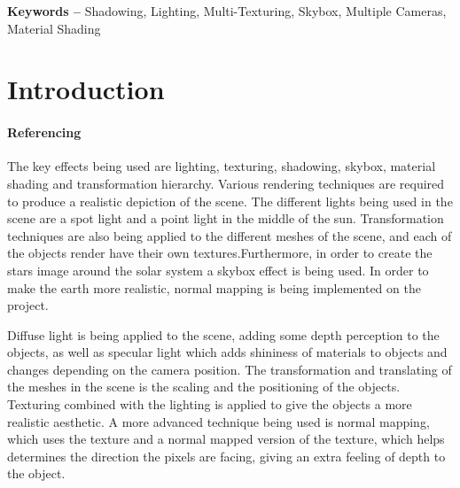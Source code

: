 \documentclass[10pt, a4paper]{article}
\title{\mytitle}
\author{\myauthor\hspace{1em}\\\contact\\Edinburgh Napier University\hspace{0.5em}-\hspace{0.5em}\mymodule}
\date{}
\newcommand{\figuremacro}[5]{
    \begin{figure}[#1]
        \centering
        \texttt{[image: \#2]}
        \caption[#3]{\textbf{#3}#4}
        \label{fig:#2}
    \end{figure}
}
\begin{document}
	
		\hyphenchar{}    
	
	\maketitle
	\begin{abstract}
	The aim of this project was to render a realistic scene using the skills developed in the Computer Graphics Module at Edinburgh Napier University using OpenGL and C++. The scene produced in this project is a solar system, inspired by my adoration for the stars and the Star Wars movies \cite{StarWars}. Advanced 3D effects and techniques are used to accomplish the generated result, such as lighting,shadowing and texturing. These techniques are widely used in a variety of games.
	\figuremacro{h}{MillenniumFalcon}{Millenium Falcon}{ - Chase Camera Inspiration}{1.0}
	\end{abstract}
    
	\textbf{Keywords -- }{Shadowing, Lighting, Multi-Texturing, Skybox, Multiple Cameras, Material Shading}
	\section{Introduction}
    \paragraph{Referencing}

    The key effects being used are lighting, texturing, shadowing, skybox, material shading and transformation hierarchy. Various rendering techniques are required to produce a realistic depiction of the scene. The different lights being used in the scene are a spot light and a point light in the middle of the sun. Transformation techniques are also being applied to the different meshes of the scene, and each of the objects render have their own textures.Furthermore, in order to create the stars image around the solar system a skybox effect is being used. In order to make the earth more realistic, normal mapping is being implemented on the project.
    
    Diffuse light is being applied to the scene, adding some depth perception to the objects, as well as specular light which adds shininess of materials to objects and changes depending on the camera position. The transformation and translating of the meshes in the scene is the scaling and the positioning of the objects. Texturing combined with the lighting is applied to give the objects a more realistic aesthetic.  A more advanced technique being used is normal mapping, which uses the texture and a normal mapped version of the texture, which helps determines the direction the pixels are facing, giving an extra feeling of depth to the object.
    
\end{document}
